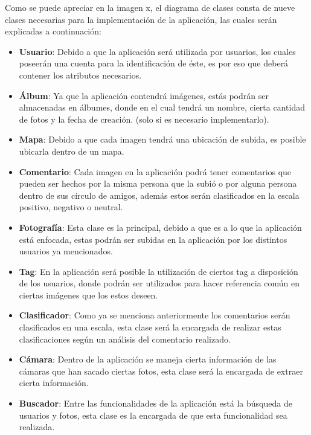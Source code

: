 \documentclass{memoria}
\begin{document}
\newpage


Como se puede apreciar en la imagen x, el diagrama de clases consta de nueve clases necesarias para la implementación de la aplicación, las cuales serán explicadas a continuación:

\begin{itemize}
    \item \textbf{Usuario}: Debido a que la aplicación será utilizada por usuarios, los cuales poseerán una cuenta para la identificación de éste, es por eso que deberá contener los atributos necesarios. 
    \item \textbf{Álbum}: Ya que la aplicación contendrá imágenes, estás podrán ser almacenadas en álbumes, donde en el cual tendrá un nombre, cierta cantidad de fotos y la fecha de creación. (solo si es necesario implementarlo).
    \item \textbf{Mapa}: Debido a que cada imagen tendrá una ubicación de subida, es posible ubicarla dentro de un mapa.
    \item \textbf{Comentario}: Cada imagen en la aplicación podrá tener comentarios que pueden ser hechos por la misma persona que la subió o por alguna persona dentro de sus círculo de amigos, además estos serán clasificados en la escala positivo, negativo o neutral.
    \item \textbf{Fotografía}: Esta clase es la principal, debido a que es a lo que la aplicación está enfocada, estas podrán ser subidas en la aplicación por los distintos usuarios ya mencionados.
    \item \textbf{Tag}: En la aplicación será posible la utilización de ciertos tag a disposición de los usuarios, donde podrán ser utilizados para hacer referencia común en ciertas imágenes que los estos deseen.
    \item \textbf{Clasificador}: Como ya se menciona anteriormente los comentarios serán clasificados en una escala, esta clase será la encargada de realizar estas clasificaciones según un análisis del comentario realizado.
    \item \textbf{Cámara}: Dentro de la aplicación se maneja cierta información de las cámaras que han sacado ciertas fotos, esta clase será la encargada de extraer cierta información.
    \item \textbf{Buscador}: Entre las funcionalidades de la aplicación está la búsqueda de usuarios y fotos, esta clase es la encargada de que esta funcionalidad sea realizada.   
\end{itemize}
\end{document}
